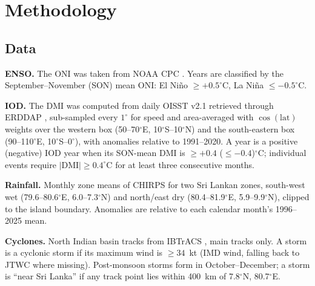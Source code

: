 \documentclass{article}
\begin{document}
\section{Methodology}

\subsection{Data}
\textbf{ENSO.} The ONI was taken from NOAA CPC \cite{noaa_oni}. Years are classified by the
September--November (SON) mean ONI: El Ni\~{n}o $\geq+0.5^{\circ}$C, La Ni\~{n}a $\leq-0.5^{\circ}$C.

\textbf{IOD.} The DMI was computed from daily OISST v2.1 \cite{huang2021} retrieved through ERDDAP
\cite{erddap_oisst}, sub-sampled every $1^{\circ}$ for speed and area-averaged with $\cos(\text{lat})$
weights over the western box (50--70$^{\circ}$E, 10$^{\circ}$S--10$^{\circ}$N) and the south-eastern box
(90--110$^{\circ}$E, 10$^{\circ}$S--0$^{\circ}$), with anomalies relative to 1991--2020. A year is a
positive (negative) IOD year when its SON-mean DMI is $\geq+0.4$ ($\leq-0.4$)$^{\circ}$C; individual
events require $|\text{DMI}|\geq0.4^{\circ}$C for at least three consecutive months.

\textbf{Rainfall.} Monthly zone means of CHIRPS \cite{funk2015chirps} for two Sri Lankan zones,
south-west wet (79.6--80.6$^{\circ}$E, 6.0--7.3$^{\circ}$N) and north/east dry (80.4--81.9$^{\circ}$E,
5.9--9.9$^{\circ}$N), clipped to the island boundary. Anomalies are relative to each calendar month's
1996--2025 mean.

\textbf{Cyclones.} North Indian basin tracks from IBTrACS \cite{knapp2010,ibtracs_ni}, main tracks only.
A storm is a cyclonic storm if its maximum wind is $\geq34$~kt (IMD wind, falling back to JTWC where
missing). Post-monsoon storms form in October--December; a storm is ``near Sri Lanka'' if any track
point lies within 400~km of 7.8$^{\circ}$N, 80.7$^{\circ}$E.
\end{document}
